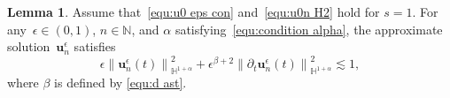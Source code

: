 \documentclass[11pt,reqno]{amsart}
\theoremstyle{definition}
\newtheorem{lemma}[theorem]{Lemma}
\numberwithin{equation}{section}
\newcommand{\bff}{\boldsymbol}
\newcommand{\bb}{\mathbb}
\newcommand{\ds}{\mathrm{d}s}
\newcommand{\pa}{\partial}
\newcommand{\norm}[2]{\left\|{#1}\right\|_{#2}}
\begin{document}
%


\begin{lemma}\label{lem:ene est 4}
	Assume that~\eqref{equ:u0 eps con} and~\eqref{equ:u0n H2} hold for $s=1$. 
	For any~$\epsilon\in(0,1)$, $n\in\bb{N}$, and $\alpha$ satisfying~\eqref{equ:condition alpha}, the approximate
	solution~$\bff{u}_n^\epsilon$ satisfies
	\begin{equation}\label{equ:Lap H1s est}
		\epsilon \norm{\bff{u}_n^\epsilon(t)}{\bb{H}^{1+\alpha}}^2
		+
		\epsilon^{\beta+2}
		\norm{\pa_t\bff{u}_n^\epsilon(t)}{\bb{H}^{1+\alpha}}^2 
		\lesssim 
		1,
	\end{equation}
	where $\beta$ is defined by \eqref{equ:d ast}.
\end{lemma}
\end{document}
